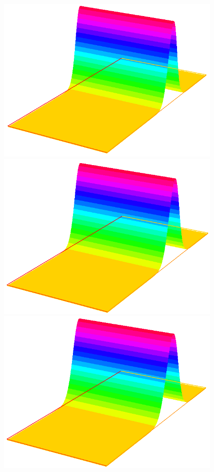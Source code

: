 \begin{figure}[!h]
\begin{center}
\includegraphics[scale=0.3]{images/capture5.png}
\includegraphics[scale=0.3]{images/capture6.png}\\
\includegraphics[scale=0.3]{images/capture7.png}

\end{center}
\end{figure}
